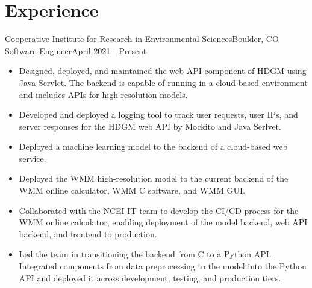 \section{Experience}

\resumeSubHeadingListStart

\resumeSubheading
{Cooperative Institute for Research in Environmental Sciences}{Boulder, CO}
{Software Engineer}{April 2021 - Present}

\resumeItemListStart
 
  \begin{itemize}
  	\item Designed, deployed, and maintained the web API component of HDGM using Java Servlet. The backend is capable of running in a cloud-based environment and includes APIs for high-resolution models.
  	\item Developed and deployed a logging tool to track user requests, user IPs, and server responses for the HDGM web API by Mockito and Java Serlvet.
  	\item Deployed a machine learning model to the backend of a cloud-based web service.
  \end{itemize}
  
  \begin{itemize}
  	\item Deployed the WMM high-resolution model to the current backend of the WMM online calculator, WMM C software, and WMM GUI.
  	\item Collaborated with the NCEI IT team to develop the CI/CD process for the WMM online calculator, enabling deployment of the model backend, web API backend, and frontend to production.
  	\item Led the team in transitioning the backend from C to a Python API. Integrated components from data preprocessing to the model into the Python API and deployed it across development, testing, and production tiers.
  	
  \end{itemize}
  
